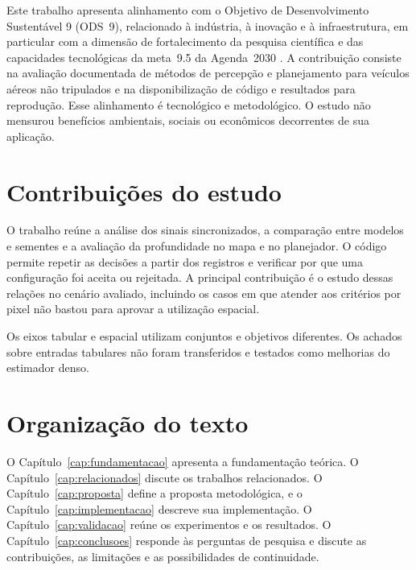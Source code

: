 Este trabalho apresenta alinhamento com o Objetivo de Desenvolvimento Sustentável 9 (ODS~9), relacionado à indústria, à inovação e à infraestrutura, em particular com a dimensão de fortalecimento da pesquisa científica e das capacidades tecnológicas da meta~9.5 da Agenda~2030 \cite{ONUAgenda2030}. A contribuição consiste na avaliação documentada de métodos de percepção e planejamento para veículos aéreos não tripulados e na disponibilização de código e resultados para reprodução. Esse alinhamento é tecnológico e metodológico. O estudo não mensurou benefícios ambientais, sociais ou econômicos decorrentes de sua aplicação.

\section{Contribuições do estudo}

O trabalho reúne a análise dos sinais sincronizados, a comparação entre modelos e sementes e a avaliação da profundidade no mapa e no planejador. O código permite repetir as decisões a partir dos registros e verificar por que uma configuração foi aceita ou rejeitada. A principal contribuição é o estudo dessas relações no cenário avaliado, incluindo os casos em que atender aos critérios por pixel não bastou para aprovar a utilização espacial.

Os eixos tabular e espacial utilizam conjuntos e objetivos diferentes. Os achados sobre entradas tabulares não foram transferidos e testados como melhorias do estimador denso.

\section{Organização do texto}\label{Organizacao_do_texto}

O Capítulo~\ref{cap:fundamentacao} apresenta a fundamentação teórica. O Capítulo~\ref{cap:relacionados} discute os trabalhos relacionados. O Capítulo~\ref{cap:proposta} define a proposta metodológica, e o Capítulo~\ref{cap:implementacao} descreve sua implementação. O Capítulo~\ref{cap:validacao} reúne os experimentos e os resultados. O Capítulo~\ref{cap:conclusoes} responde às perguntas de pesquisa e discute as contribuições, as limitações e as possibilidades de continuidade.
